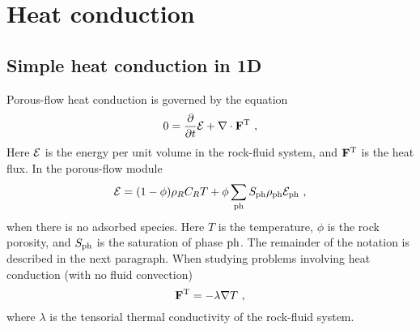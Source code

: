 \chapter{Heat conduction}
\section{Simple heat conduction in 1D}

Porous-flow heat conduction is governed by the equation
\begin{equation}
0 = \frac{\partial}{\partial t}\mathcal{E} + \nabla\cdot \mathbf{F}^{\mathrm{T}} \ ,
\label{eqn.heat.cond}
\end{equation}
Here $\mathcal{E}$ is the energy per unit volume in the rock-fluid
system, and $\mathbf{F}^{\mathrm{T}}$ is the heat flux.  In the
porous-flow module
\begin{equation}
\mathcal{E} = (1 - \phi)\rho_{R}C_{R} T + \phi
\sum_{\mathrm{ph}}S_{\mathrm{ph}}\rho_{\mathrm{ph}}\mathcal{E}_{\mathrm{ph}} \ ,
\end{equation}
when there is no adsorbed species.  Here $T$ is the temperature,
$\phi$ is the rock porosity, and $S_{\mathrm{ph}}$ is the saturation of
phase $\mathrm{ph}$.  The remainder of the notation is described in the
next paragraph.  When studying problems involving heat conduction
(with no fluid convection)
\begin{equation}
\flux^{\mathrm{T}} = -\lambda\nabla T \ ,
\end{equation}
where $\lambda$ is the tensorial thermal conductivity of the
rock-fluid system.

